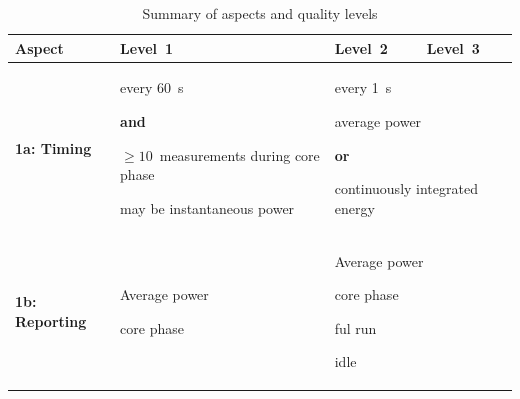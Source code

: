 \newlength{\tablecolumnwidth}
\setlength{\tablecolumnwidth}{3.5cm}
\noindent
\begin{table}
\caption{Summary of aspects and quality levels}
\label{tab:levels}
\begin{tabular}{|p{2.5cm}|p{3.5cm}|p{3.5cm}|p{3.5cm}|} \hline
\textbf{Aspect}&\textbf{Level~1}&\textbf{Level~2}&\textbf{Level~3}\\ \hline

\textbf{1a: Timing} &
\begin{minipage}[t]{\tablecolumnwidth}
      \begin{compactitemize}
            \item every 60~s
            \item[] \textbf{and}
            \item $\ge10$~measurements during core phase
            \item may be instantaneous power
      \end{compactitemize}
\end{minipage} &
\multicolumn{2}{p{2\tablecolumnwidth}|}{
      \begin{minipage}[t]{2\tablecolumnwidth}
            \begin{compactitemize}
                  \item every 1~s
                  \item average power
                  \item[] \textbf{or}
                  \item continuously integrated energy
            \end{compactitemize}
      \end{minipage}
} \\
\hline


\textbf{1b: Reporting} &
\begin{minipage}[t]{\tablecolumnwidth}
      Average power
      \begin{compactitemize}
            \item core phase
      \end{compactitemize}
\end{minipage} &
\multicolumn{2}{p{2\tablecolumnwidth}|}{
      \begin{minipage}[t]{2\tablecolumnwidth}
            Average power
            \begin{compactitemize}
                  \item core phase
                  \item ful run
                  \item idle
            \end{compactitemize}
      \end{minipage}
} \\
\hline



\end{tabular}
\end{table}
